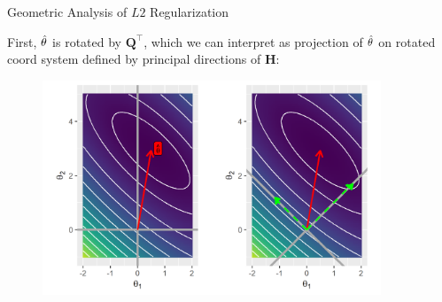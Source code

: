 \documentclass[11pt,compress,t,notes=noshow, xcolor=table]{beamer}
\begin{document}
\begin{vbframe}{Geometric Analysis of $L2$ Regularization}

First, $\hat{\theta}$ is rotated by $\bm{Q}^{\top}$, which we can interpret as projection of $\hat{\theta}$ on rotated coord system defined by principal directions of $\bm{H}$:

\begin{figure}
\includegraphics[width=0.9\textwidth]{figure/l2_reg_hess_01.png}\\
\end{figure}




\end{vbframe}
\end{document}
